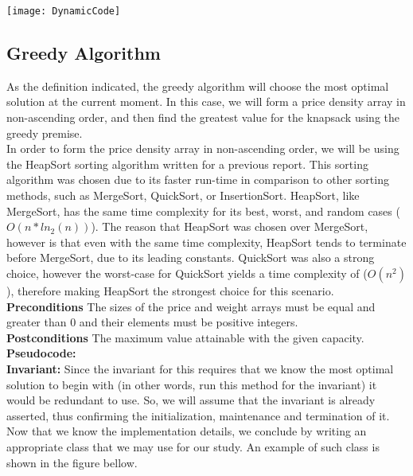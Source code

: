 \documentclass[12pt]{article}
\begin{document}
\texttt{[image: DynamicCode]}
\subsection*{Greedy Algorithm}

As the definition indicated, the greedy algorithm will choose the most optimal solution at the current moment. In this case, we will form a price density array in non-ascending order, and then find the greatest value for the knapsack using the greedy premise. \\

In order to form the price density array in non-ascending order, we will be using the HeapSort sorting algorithm written for a previous report. This sorting algorithm was chosen due to its faster run-time in comparison to other sorting methods, such as MergeSort, QuickSort, or InsertionSort. HeapSort, like MergeSort, has the same time complexity for its best, worst, and random cases ($O(n*ln_2(n))$). The reason that HeapSort was chosen over MergeSort, however is that even with the same time complexity, HeapSort tends to terminate before MergeSort, due to its leading constants. QuickSort was also a strong choice, however the worst-case for QuickSort yields a time complexity of ($O(n^2)$), therefore making HeapSort the strongest choice for this scenario.\\

\textbf{Preconditions} The sizes of the price and weight arrays must be equal and greater than 0 and their elements must be positive integers. \\

\textbf{Postconditions} The maximum value attainable with the given capacity.\\

\textbf{Pseudocode:} \\

\textbf{Invariant:} Since the invariant for this requires that we know the most optimal solution to begin with (in other words, run this method for the invariant) it would be redundant to use. So,  we will assume that the invariant is already asserted, thus confirming the initialization, maintenance and termination of it.\\

Now that we know the implementation details, we conclude by writing an appropriate class that we may use for our study. An example of such class is shown in the figure bellow.
\end{document}
